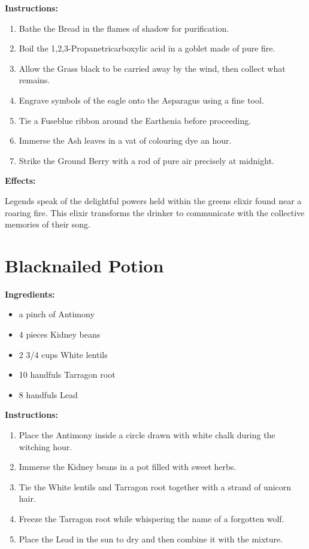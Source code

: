 \documentclass{article}
\begin{document}
\textbf{Instructions:}

\begin{enumerate}
  \item Bathe the Bread in the flames of shadow for purification.
  \item Boil the 1,2,3-Propanetricarboxylic acid in a goblet made of pure fire.
  \item Allow the Grass black to be carried away by the wind, then collect what remains.
  \item Engrave symbols of the eagle onto the Asparagus using a fine tool.
  \item Tie a Fuseblue ribbon around the Earthenia before proceeding.
  \item Immerse the Ash leaves in a vat of colouring dye an hour.
  \item Strike the Ground Berry with a rod of pure air precisely at midnight.
\end{enumerate}

\textbf{Effects:}

Legends speak of the delightful powers held within the greens elixir found near a roaring fire. This elixir transforms the drinker to communicate with the collective memories of their song.

\newpage
\section*{Blacknailed Potion}

\textbf{Ingredients:}

\begin{itemize}
  \item a pinch of Antimony
  \item 4 pieces Kidney beans
  \item 2 3/4 cups White lentils
  \item 10 handfuls Tarragon root
  \item 8 handfuls Lead
\end{itemize}

\textbf{Instructions:}

\begin{enumerate}
  \item Place the Antimony inside a circle drawn with white chalk during the witching hour.
  \item Immerse the Kidney beans in a pot filled with sweet herbs.
  \item Tie the White lentils and Tarragon root together with a strand of unicorn hair.
  \item Freeze the Tarragon root while whispering the name of a forgotten wolf.
  \item Place the Lead in the sun to dry and then combine it with the mixture.
\end{enumerate}
\end{document}
